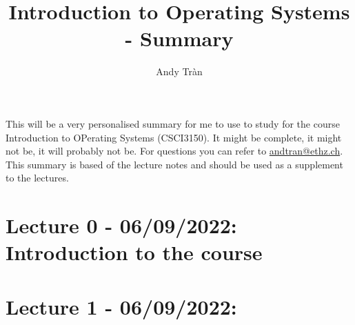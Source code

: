 \documentclass[11pt]{article}
\begin{document}
 
 
\title{Introduction to Operating Systems - Summary}%
\author{Andy Tràn}
 
\maketitle %

This will be a very personalised summary for me to use to study for the course Introduction to OPerating Systems (CSCI3150). It might be complete, it might not be, it will probably not be. For questions you can refer to \href{mailto:andtran@ethz.ch}{andtran@ethz.ch}. This summary is based of the lecture notes and should be used as a supplement to the lectures. 

\tableofcontents

\newpage

\section{Lecture 0 - 06/09/2022: Introduction to the course}

\section{Lecture 1 - 06/09/2022: }
\end{document}
